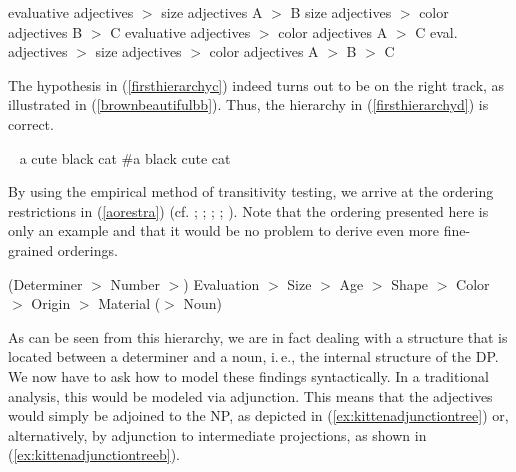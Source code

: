\begin{exe}
\ex\label{firsthierarchy}\begin{xlist} 
\ex evaluative adjectives $>$ size adjectives \hfill A $>$ B \label{firsthierarchya}
\ex size adjectives $>$ color adjectives \hfill B $>$ C \label{firsthierarchyb} 
\ex evaluative adjectives $>$ color adjectives \hfill A $>$ C \label{firsthierarchyc}
\ex eval. adjectives $>$ size adjectives $>$ color adjectives \hfill A $>$ B $>$ C \label{firsthierarchyd}
\end{xlist}
\end{exe}


\noindent The hypothesis in (\ref{firsthierarchyc}) indeed turns out to be on the right track, as illustrated in (\ref{brownbeautifulbb}). Thus, the hierarchy in (\ref{firsthierarchyd}) is correct.

\begin{exe}
\ex\label{brownbeautifulbb}\begin{xlist} 
\ex \textcolor{white}{\#}a cute black cat \label{ex:brownbeautifulbba} 
\ex \#{a black cute cat \label{ex:brownbeautifulbbb} }
\end{xlist}
\end{exe}

\noindent By using the empirical method of transitivity testing, we arrive at the ordering restrictions in (\ref{aorestra}) (cf. \citealt{kingsbury1986longman}; \citealt{sproat1991cross}; \citealt{cinque1994evidence}; \citealt[1304--1308]{hole2015arguments}; \citealt[107--110]{van2017syntax}). Note that the ordering presented here is only an example and that it would be no problem to derive even more fine-grained orderings.

\begin{exe}
\ex\label{aorestra} (Determiner $>$ Number $>$) Evaluation $>$ Size $>$ Age $>$ Shape $>$ Color $>$ Origin $>$ Material ($>$ Noun)
\end{exe}

\noindent As can be seen from this hierarchy, we are in fact dealing with a structure that is located between a determiner and a noun, i.\,e., the internal structure of the DP. We now have to ask how to model these findings syntactically. In a traditional analysis, this would be modeled via adjunction. This means that the adjectives would simply be adjoined to the NP, as depicted in (\ref{ex:kittenadjunctiontree}) or, alternatively, by adjunction to intermediate projections, as shown in (\ref{ex:kittenadjunctiontreeb}).

